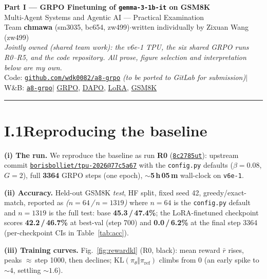 \documentclass[11pt]{article}
\newcommand{\wb}[1]{\href{https://wandb.ai/sichengma0514-university-of-cambridge/a8-grpo/runs/#1}{\texttt{#1}}}
\newcommand{\axv}[2]{\href{https://arxiv.org/abs/#1}{#2}}
\newcommand{\code}[1]{\texttt{#1}}
\begin{document}
\begin{center}
  {\Large\bfseries Part I --- GRPO Finetuning of \texttt{gemma-3-1b-it} on GSM8K}\\[3pt]
  {Multi-Agent Systems and Agentic AI --- Practical Examination}\\[5pt]
  {\small Team \textbf{chmawa} (sm3035, bc654, zw499)\quad$\cdot$\quad written individually by Zixuan Wang (zw499)}\\[3pt]
  {\small\itshape Jointly owned (shared team work): the v6e-1 TPU, the six shared GRPO runs R0--R5, and the code repository.
  All prose, figure selection and interpretation below are my own.}\\[3pt]
  {\small Code: \href{https://github.com/wdk0082/a8-grpo}{\texttt{github.com/wdk0082/a8-grpo}} \emph{(to be ported to GitLab for submission)}\;$\mid$\;
  W\&B: \href{https://wandb.ai/sichengma0514-university-of-cambridge/a8-grpo}{\texttt{a8-grpo}}\;$\mid$\;
  \axv{2402.03300}{GRPO}, \axv{2503.14476}{DAPO}, \axv{2106.09685}{LoRA}, \href{https://huggingface.co/datasets/openai/gsm8k}{GSM8K}}
\end{center}
\vspace{1pt}\hrule\vspace{4pt}

\section*{I.1\quad Reproducing the baseline}
\textbf{(i) The run.} We reproduce the baseline as run \textbf{R0} (\wb{8c2785ut}): upstream commit
\href{https://github.com/borisbolliet/tpu-2026}{\texttt{borisbolliet/tpu-2026@77c5a67}} with the \code{config.py} defaults
($\beta{=}0.08$, $G{=}2$), full \textbf{3364} GRPO steps (one epoch), \textbf{$\sim$5\,h\,05\,m} wall-clock on \code{v6e-1}.

\textbf{(ii) Accuracy.} Held-out GSM8K \emph{test}, HF split, fixed seed 42, greedy/exact-match, reported as \emph{($n{=}64$\,/\,$n{=}1319$)} where
$n{=}64$ is the \code{config.py} default and $n{=}1319$ is the full test: base \textbf{45.3\,/\,47.4\%}; the LoRA-finetuned checkpoint scores
\textbf{42.2\,/\,46.7\%} at best-val (step 700) and \textbf{0.0\,/\,6.2\%} at the final step 3364 (per-checkpoint CIs in Table~\ref{tab:acc}).

\textbf{(iii) Training curves.} Fig.~\ref{fig:rewardkl} (R0, black): mean reward $\bar r$ rises, peaks $\approx$\,step 1000, then declines;
$\mathrm{KL}(\pi_\theta\Vert\pi_{\mathrm{ref}})$ climbs from $0$ (an early spike to ${\sim}4$, settling ${\sim}1.6$).
\end{document}
